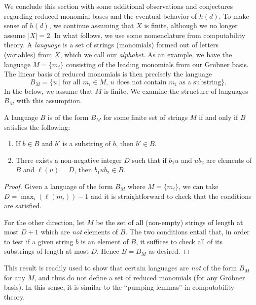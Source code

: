 We conclude this section with some additional observations and conjectures regarding reduced monomial bases and the eventual behavior of $h(d)$. To make sense of $h(d)$, we continue assuming that $X$ is finite, although we no longer assume $|X| = 2$. In what follows, we use some nomenclature from computability theory. A \emph{language} is a set of strings (monomials) formed out of letters (variables) from $X$, which we call our \emph{alphabet}. As an example, we have the language $M = \{m_i\}$ consisting of the leading monomials from our Gr\"obner basis. The linear basis of reduced monomials is then precisely the language
\[
	B_M = \{u \mid \text{for all }m_i \in M\text{, }u \text{ does not contain }m_i\text{ as a substring}\}.
\]  
In the below, we assume that $M$ is finite. We examine the structure of languages $B_M$ with this assumption.
\begin{prop}\label{prop:BM-characterization}
	A language $B$ is of the form $B_M$ for some finite set of strings $M$ if and only if $B$ satisfies the following:
	\begin{enumerate}
		\item\label{item:substringcondition} If $b \in B$ and $b'$ is a substring of $b$, then $b' \in B$.
		\item\label{item:gluingcondition} There exists a non-negative integer $D$ such that if $b_1 u$ and $u b_2$ are elements of $B$ and $\ell(u) = D$, then $b_1 u b_2 \in B$.
	\end{enumerate}
\end{prop}
\begin{proof}
	Given a language of the form $B_M$ where $M=\{m_i\}$, we can take $D = \max_i(\ell(m_i))-1$ and it is straightforward to check that the conditions are satisfied.
	
	For the other direction, let $M$ be the set of all (non-empty) strings of length at most $D + 1$ which are \emph{not} elements of $B$. The two conditions entail that, in order to test if a given string $b$ is an element of $B$, it suffices to check all of its substrings of length at most $D$. Hence $B = B_M$ as desired.
\end{proof}
This result is readily used to show that certain languages are \emph{not} of the form $B_M$ for any $M$, and thus do not define a set of reduced monomials (for any Gr\"obner basis). In this sense, it is similar to the ``pumping lemmas'' in computability theory.


